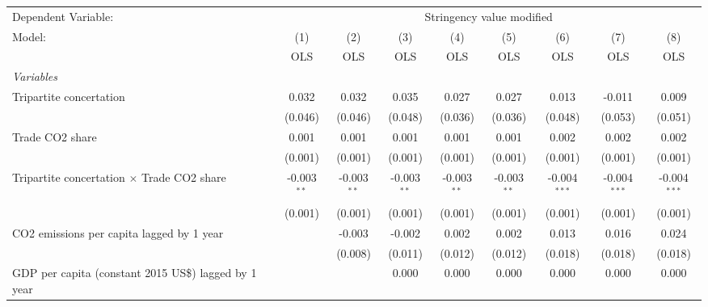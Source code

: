 
\begingroup
\centering
\begin{tabular}{lcccccccc}
   \toprule
   Dependent Variable: & \multicolumn{8}{c}{Stringency value modified}\\
   Model:                                                    & (1)           & (2)           & (3)           & (4)           & (5)           & (6)            & (7)            & (8)\\  
                                                             &  OLS          & OLS           & OLS           & OLS           & OLS           & OLS            & OLS            & OLS\\  
   \midrule
   \emph{Variables}\\
   Tripartite concertation                                   & 0.032         & 0.032         & 0.035         & 0.027         & 0.027         & 0.013          & -0.011         & 0.009\\   
                                                             & (0.046)       & (0.046)       & (0.048)       & (0.036)       & (0.036)       & (0.048)        & (0.053)        & (0.051)\\   
   Trade CO2 share                                           & 0.001         & 0.001         & 0.001         & 0.001         & 0.001         & 0.002          & 0.002          & 0.002\\   
                                                             & (0.001)       & (0.001)       & (0.001)       & (0.001)       & (0.001)       & (0.001)        & (0.001)        & (0.001)\\   
   Tripartite concertation $\times$ Trade CO2 share          & -0.003$^{**}$ & -0.003$^{**}$ & -0.003$^{**}$ & -0.003$^{**}$ & -0.003$^{**}$ & -0.004$^{***}$ & -0.004$^{***}$ & -0.004$^{***}$\\   
                                                             & (0.001)       & (0.001)       & (0.001)       & (0.001)       & (0.001)       & (0.001)        & (0.001)        & (0.001)\\   
   CO2 emissions per capita lagged by 1 year                 &               & -0.003        & -0.002        & 0.002         & 0.002         & 0.013          & 0.016          & 0.024\\   
                                                             &               & (0.008)       & (0.011)       & (0.012)       & (0.012)       & (0.018)        & (0.018)        & (0.018)\\   
   GDP per capita (constant 2015 US\$) lagged by 1 year      &               &               & 0.000         & 0.000         & 0.000         & 0.000          & 0.000          & 0.000\\   

\end{tabular}
